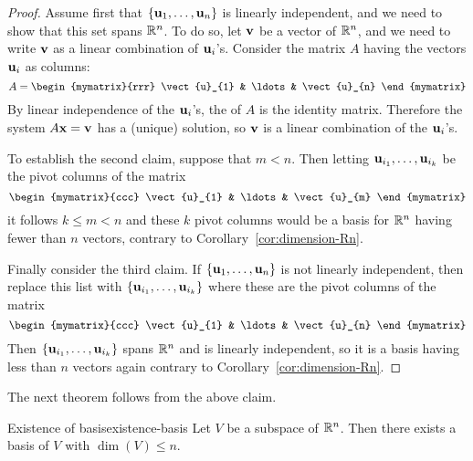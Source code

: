 \begin{proof}
  Assume first that $\left\{\mbox{\bf u}_{1},\ldots ,\mbox{\bf u}_{n}\right\} $ is
  linearly independent, and we need to show that this set spans
  $\mathbb{R}^{n}$. To do so, let $\mbox{\bf v}$ be a vector of $\mathbb{R}^{n}$, and we
  need to write $\mbox{\bf v}$ as a linear combination of $\mbox{\bf u}_i$'s.
  Consider the matrix $A$ having the vectors $\mbox{\bf u}_i$ as columns:
  \begin{equation*}
    A = 
    \begin{mymatrix}{rrr}
      \vect{u}_{1} & \ldots & \vect{u}_{n} 
    \end{mymatrix}
  \end{equation*}
  By linear independence of the $\mbox{\bf u}_i$'s, the {\rref} of $A$ is
  the identity matrix.  Therefore the system $A\mbox{\bf x}= \mbox{\bf v}$ has
  a (unique) solution, so $\mbox{\bf v}$ is a linear combination of the
  $\mbox{\bf u}_i$'s.

  To establish the second claim, suppose that $m<n$. Then letting
  $\mbox{\bf u}_{i_{1}},\ldots ,\mbox{\bf u}_{i_{k}}$ be the pivot columns of
  the matrix
  \begin{equation*}
    \begin{mymatrix}{ccc}
      \vect{u}_{1} & \ldots & \vect{u}_{m}
    \end{mymatrix}
  \end{equation*}
  it follows $k\leq m<n$ and these $k$ pivot columns would be a basis
  for $\mathbb{R}^{n}$ having fewer than $n$ vectors, contrary to
  Corollary~\ref{cor:dimension-Rn}.

  Finally consider the third claim. If $\left\{\mbox{\bf u}_{1},\ldots
    ,\mbox{\bf u}_{n}\right\} $ is not linearly independent, then replace this
  list with $\left\{\mbox{\bf u}_{i_{1}},\ldots ,\mbox{\bf u}_{i_{k}}\right\} $ where these
  are the pivot columns of the matrix 
  \begin{equation*}
    \begin{mymatrix}{ccc}
      \vect{u}_{1} & \ldots & \vect{u}_{n}
    \end{mymatrix}
  \end{equation*}
  Then $\left\{\mbox{\bf u}_{i_{1}},\ldots ,\mbox{\bf u}_{i_{k}}\right\} $ spans
  $\mathbb{R}^{n}$ and is linearly independent, so it is a basis having
  less than $n$ vectors again contrary to Corollary~\ref{cor:dimension-Rn}.
\end{proof}

The next theorem follows from the above claim.

\begin{theorem}{Existence of basis}{existence-basis}
  Let $V$ be a subspace of $\mathbb{R}^n$. Then there exists a basis of $V$ with 
  $\dim(V)\leq n$.
\end{theorem}

